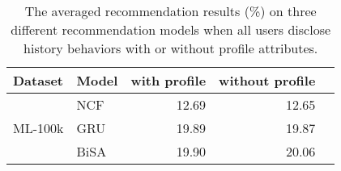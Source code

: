 \begin{table}
    \centering
    \caption{The averaged recommendation results (\%) on three different recommendation models when all users disclose history behaviors with or without profile attributes.
    }
    \label{tab:profile_rec_results}
    \begin{adjustbox}{max width=\linewidth}
    \begin{tabular}{@{}llrrr@{}}
\toprule
{Dataset} & {Model} & {with profile}&{without profile} \\ 

\midrule
\multirow{3}{*}{{ML-100k}} & {NCF} & 12.69 & 12.65   \\ 
& {GRU} &   19.89  &  19.87     \\
& {BiSA} &   19.90  & 20.06    \\

\bottomrule
\end{tabular}
\end{adjustbox}
\end{table}
